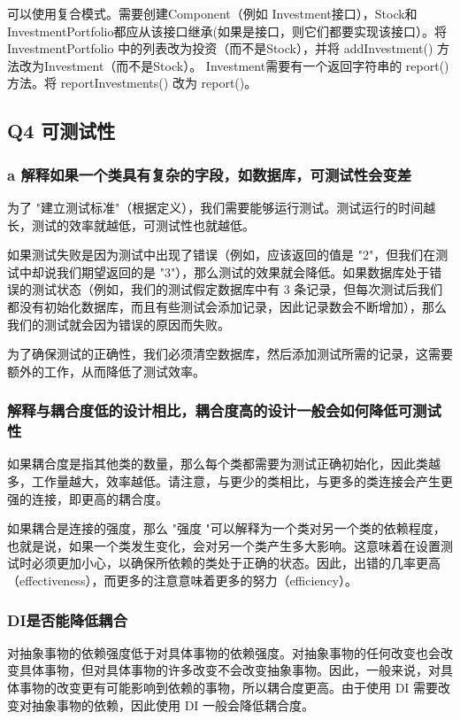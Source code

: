 可以使用复合模式。需要创建Component（例如
Investment接口），Stock和InvestmentPortfolio都应从该接口继承(如果是接口，则它们都要实现该接口）。将 InvestmentPortfolio 中的列表改为投资（而不是Stock），并将 addInvestment() 方法改为Investment（而不是Stock）。
Investment需要有一个返回字符串的 report() 方法。将 reportInvestments() 改为 report()。

\subsection{Q4 可测试性}

\subsubsection{a 解释如果一个类具有复杂的字段，如数据库，可测试性会变差}

为了 "建立测试标准"（根据定义），我们需要能够运行测试。测试运行的时间越长，测试的效率就越低，可测试性也就越低。

如果测试失败是因为测试中出现了错误（例如，应该返回的值是 "2"，但我们在测试中却说我们期望返回的是 "3"），那么测试的效果就会降低。如果数据库处于错误的测试状态（例如，我们的测试假定数据库中有 3 条记录，但每次测试后我们都没有初始化数据库，而且有些测试会添加记录，因此记录数会不断增加），那么我们的测试就会因为错误的原因而失败。

为了确保测试的正确性，我们必须清空数据库，然后添加测试所需的记录，这需要额外的工作，从而降低了测试效率。

\subsubsection{解释与耦合度低的设计相比，耦合度高的设计一般会如何降低可测试性}

如果耦合度是指其他类的数量，那么每个类都需要为测试正确初始化，因此类越多，工作量越大，效率越低。请注意，与更少的类相比，与更多的类连接会产生更强的连接，即更高的耦合度。

如果耦合是连接的强度，那么 "强度 "可以解释为一个类对另一个类的依赖程度，也就是说，如果一个类发生变化，会对另一个类产生多大影响。这意味着在设置测试时必须更加小心，以确保所依赖的类处于正确的状态。因此，出错的几率更高（effectiveness），而更多的注意意味着更多的努力（efficiency）。

\subsubsection{DI是否能降低耦合}

 对抽象事物的依赖强度低于对具体事物的依赖强度。对抽象事物的任何改变也会改变具体事物，但对具体事物的许多改变不会改变抽象事物。因此，一般来说，对具体事物的改变更有可能影响到依赖的事物，所以耦合度更高。由于使用 DI 需要改变对抽象事物的依赖，因此使用 DI 一般会降低耦合度。


